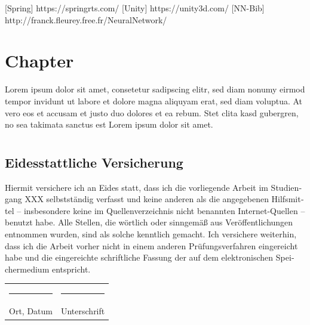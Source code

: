 \documentclass[
	12pt,
	a4paper,
	BCOR10mm,
	DIV14,
	headsepline,
	usegeometry,
]{scrreprt}
\begin{document}
\appendix
\appendixpage

[Spring] https://springrts.com/
[Unity] https://unity3d.com/
[NN-Bib] http://franck.fleurey.free.fr/NeuralNetwork/

\chapter{Chapter}

Lorem ipsum dolor sit amet, consetetur sadipscing elitr, sed diam nonumy eirmod tempor invidunt ut labore et dolore magna aliquyam erat, sed diam voluptua.
At vero eos et accusam et justo duo dolores et ea rebum.
Stet clita kasd gubergren, no sea takimata sanctus est Lorem ipsum dolor sit amet.

\listoffigures

\lstlistoflistings

\listoftables

\chapter*{}

\thispagestyle{empty}

\section*{Eidesstattliche Versicherung}

\begin{otherlanguage}{ngerman}
Hiermit versichere ich an Eides statt, dass ich die vorliegende Arbeit im Studiengang XXX selbstständig verfasst und keine anderen als die angegebenen Hilfsmittel -- insbesondere keine im Quellenverzeichnis nicht benannten Internet-Quellen -- benutzt habe.
Alle Stellen, die wörtlich oder sinngemäß aus Veröffentlichungen entnommen wurden, sind als solche kenntlich gemacht.
Ich versichere weiterhin, dass ich die Arbeit vorher nicht in einem anderen Prüfungsverfahren eingereicht habe und die eingereichte schriftliche Fassung der auf dem elektronischen Speichermedium entspricht.
\end{otherlanguage}

\vspace{1cm}

\begin{center}
\begin{tabular}{ll}
	\rule{0.35\textwidth}{0.4pt} & \rule{0.55\textwidth}{0.4pt} \\
	Ort, Datum & Unterschrift
\end{tabular}
\end{center}
\end{document}
